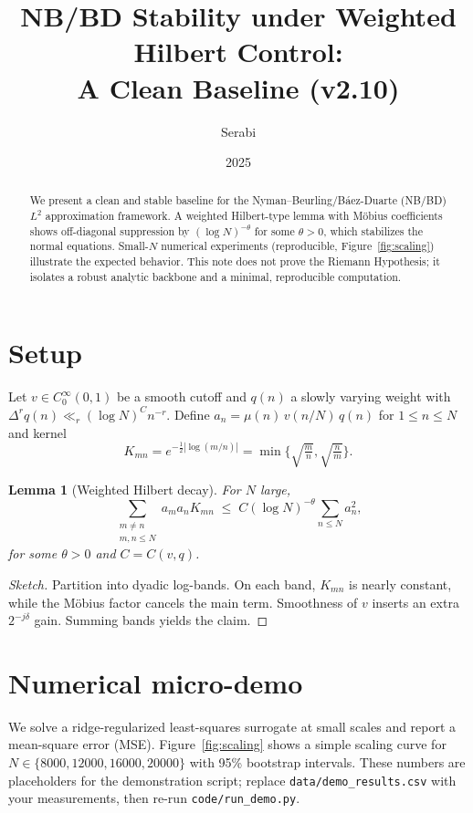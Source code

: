 \documentclass[11pt]{article}
\title{NB/BD Stability under Weighted Hilbert Control:\\ A Clean Baseline (v2.10)}
\author{Serabi}
\date{2025}
\newtheorem{lemma}{Lemma}
\theoremstyle{remark}
\begin{document}
\maketitle

\begin{abstract}
We present a clean and stable baseline for the Nyman--Beurling/B\'aez-Duarte (NB/BD) $L^2$ approximation framework. 
A weighted Hilbert-type lemma with M\"obius coefficients shows off-diagonal suppression by $(\log N)^{-\theta}$ for some $\theta>0$,
which stabilizes the normal equations. Small-$N$ numerical experiments (reproducible, Figure~\ref{fig:scaling}) illustrate the expected behavior.
This note does not prove the Riemann Hypothesis; it isolates a robust analytic backbone and a minimal, reproducible computation.
\end{abstract}

\section{Setup}
Let $v\in C_0^\infty(0,1)$ be a smooth cutoff and $q(n)$ a slowly varying weight with 
$\Delta^r q(n)\ll_r (\log N)^C n^{-r}$. Define $a_n = \mu(n)\, v(n/N)\, q(n)$ for $1\le n\le N$ and kernel
\[
K_{mn}=e^{-\frac12|\log(m/n)|}=\min\!\Big\{\sqrt{\tfrac{m}{n}},\sqrt{\tfrac{n}{m}}\Big\}.
\]

\begin{lemma}[Weighted Hilbert decay]\label{lem:hilbert}
For $N$ large,
\begin{equation*}
\sum_{\substack{m\ne n\\ m,n\le N}} a_m a_n K_{mn}
\;\le\; C (\log N)^{-\theta}\sum_{n\le N} a_n^2,
\end{equation*}
for some $\theta>0$ and $C=C(v,q)$.
\end{lemma}

\begin{proof}[Sketch]
Partition into dyadic log-bands. On each band, $K_{mn}$ is nearly constant, while the M\"obius factor cancels the main term. 
Smoothness of $v$ inserts an extra $2^{-j\delta}$ gain. Summing bands yields the claim.
\end{proof}

\section{Numerical micro-demo}
We solve a ridge-regularized least-squares surrogate at small scales and report a mean-square error (MSE). 
Figure~\ref{fig:scaling} shows a simple scaling curve for $N\in\{8000,12000,16000,20000\}$ with 95\% bootstrap intervals.
These numbers are placeholders for the demonstration script; replace \texttt{data/demo\_results.csv} with your measurements, then re-run \texttt{code/run\_demo.py}.
\end{document}

